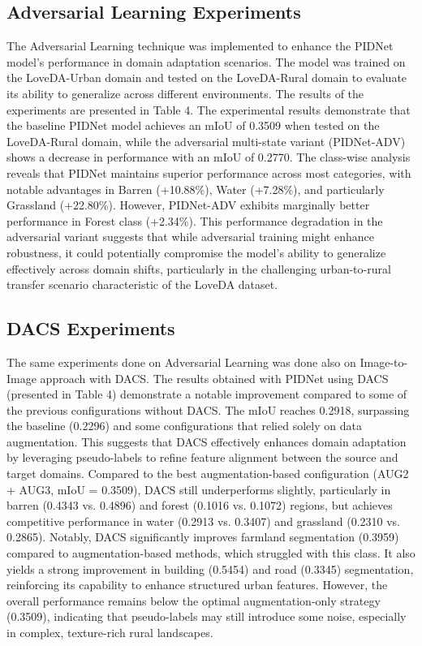 \documentclass[10pt,twocolumn,letterpaper]{article}
\begin{document}
\subsection{Adversarial Learning Experiments}
The Adversarial Learning technique was implemented to enhance the PIDNet model's performance in domain adaptation scenarios. The model was trained on the LoveDA-Urban domain and tested on the LoveDA-Rural domain to evaluate its ability to generalize across different environments. The results of the experiments are presented in Table 4.
The experimental results demonstrate that the baseline PIDNet model achieves an mIoU of 0.3509 when tested on the LoveDA-Rural domain, while the adversarial multi-state variant (PIDNet-ADV) shows a decrease in performance with an mIoU of 0.2770. The class-wise analysis reveals that PIDNet maintains superior performance across most categories, with notable advantages in Barren (+10.88\%), Water (+7.28\%), and particularly Grassland (+22.80\%). However, PIDNet-ADV exhibits marginally better performance in Forest class (+2.34\%). This performance degradation in the adversarial variant suggests that while adversarial training might enhance robustness, it could potentially compromise the model's ability to generalize effectively across domain shifts, particularly in the challenging urban-to-rural transfer scenario characteristic of the LoveDA dataset.

\subsection{DACS Experiments}

The same experiments done on Adversarial Learning was done also on Image-to-Image approach with DACS. The results obtained with PIDNet using DACS (presented in Table 4) demonstrate a notable improvement compared to some of the previous configurations without DACS. The mIoU reaches 0.2918, surpassing the baseline (0.2296) and some configurations that relied solely on data augmentation. This suggests that DACS effectively enhances domain adaptation by leveraging pseudo-labels to refine feature alignment between the source and target domains. Compared to the best augmentation-based configuration (AUG2 + AUG3, mIoU = 0.3509), DACS still underperforms slightly, particularly in barren (0.4343 vs. 0.4896) and forest (0.1016 vs. 0.1072) regions, but achieves competitive performance in water (0.2913 vs. 0.3407) and grassland (0.2310 vs. 0.2865).
Notably, DACS significantly improves farmland segmentation (0.3959) compared to augmentation-based methods, which struggled with this class. It also yields a strong improvement in building (0.5454) and road (0.3345) segmentation, reinforcing its capability to enhance structured urban features. However, the overall performance remains below the optimal augmentation-only strategy (0.3509), indicating that pseudo-labels may still introduce some noise, especially in complex, texture-rich rural landscapes. 
\end{document}
